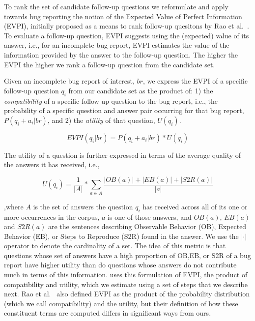 To rank the set of candidate follow-up questions we reformulate and apply towards bug reporting
the notion of the Expected Value of Perfect Information (EVPI), initially proposed as a means to
rank follow-up quesitons by Rao et al.~\cite{rao-daume-iii-2018-learning}. To evaluate a follow-up question, EVPI suggests
using the (expected) value of its answer, i.e., for an
incomplete bug report, EVPI estimates the value of the information provided by the answer to the
follow-up question. The higher the EVPI the higher we rank a follow-up question from the candidate
set.

Given an incomplete bug report of interest, $br$, we express the EVPI of a specific follow-up question $q_{i}$ from our candidate set
as the product of: 1) the {\em compatibility} of a specific follow-up question to the bug report, i.e.,
the probability of a specific question and answer pair occurring for that bug report, $P(q_{i}+a_{i}|br)$, and 2) the {\em utility} of that question, $U(q_{i})$.

$$EVPI(q_{i}|br) = P(q_{i}+a_{i}|br) * U(q_{i})$$

The utility of a question is further expressed in terms of the average quality of the answers it has received, i.e.,

$$U(q_{i}) = \frac{1}{|A|} * \sum_{a \in A}^{} \frac{|OB(a)|+|EB(a)|+|S2R(a)|}{|a|}$$

\noindent
,where $A$ is the set of answers the question $q_{i}$ has received across all of its one or more occurrences in the
corpus, $a$ is one of those answers, and $OB(a)$, $EB(a)$ and $S2R(a)$ are the sentences describing Observable Behavior (OB), Expected Behavior (EB), or
Steps to Reproduce (S2R) found in the answer. We use the $|\cdot|$ operator to denote the cardinality of a set.
The idea of this metric is that questions whose set of answers have a high proportion
of OB,EB, or S2R of a bug report have higher utility than do questions whose answers do not contribute much in
terms of this information. \evpi uses this formulation of EVPI, the product of compatibility and utility, which we
estimate using a set of steps that we describe next. Rao et al.~\cite{rao-daume-iii-2018-learning} also defined EVPI as the product of the probability distribution (which we call compatibility) and the utility, but their definition of how these constituent terms are computed differs in significant ways from ours.

